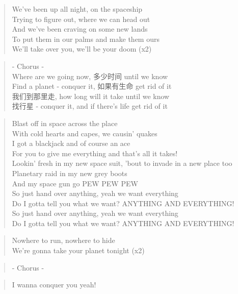 \begin{verse}
We've been up all night, on the spaceship\\
Trying to figure out, where we can head out\\
And we've been craving on some new lands\\
To put them in our palms and make them ours\\
We'll take over you, we'll be your doom (x2)
\end{verse}

\begin{verse}
- Chorus -\\
Where are we going now, 多少时间 until we know\\
Find a planet - conquer it, 如果有生命 get rid of it\\
我们到那里走, how long will it take until we know\\
找行星 - conquer it, and if there's life get rid of it
\end{verse}

\begin{verse}
Blast off in space across the place\\
With cold hearts and capes, we causin' quakes\\
I got a blackjack and of course an ace\\
For you to give me everything and that's all it takes!\\
Lookin' fresh in my new space suit, 'bout to invade in a new place too\\
Planetary raid in my new grey boots\\
And my space gun go PEW PEW PEW\\
So just hand over anything, yeah we want everything\\
Do I gotta tell you what we want? ANYTHING AND EVERYTHING!\\
So just hand over anything, yeah we want everything\\
Do I gotta tell you what we want? ANYTHING AND EVERYTHING!
\end{verse}

\begin{verse}
Nowhere to run, nowhere to hide\\
We're gonna take your planet tonight (x2)
\end{verse}

\begin{verse}
- Chorus -
\end{verse}

\begin{verse}
I wanna conquer you yeah!
\end{verse}
\clearpage
